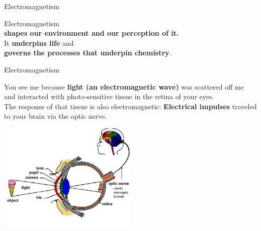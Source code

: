 %
%
%

\begin{frame}{Electromagnetism}

\begin{center}
{\Large
Electromagnetism \\ {\bf shapes our environment and our perception of it.}\\
\vspace{0.3cm}
It {\bf underpins life} and \\ {\bf governs the processes that underpin chemistry}.\\
}
\end{center}
\end{frame}


\begin{frame}{Electromagnetism}

You see me because {\bf light (an electromagnetic wave)} was scattered off me
and interacted with photo-sensitive tissue in the retina of your eyes.\\
The response of that tissue is also electromagnetic:
{\bf Electrical impulses} traveled to your brain via the optic nerve.\\

\begin{center}
   \includegraphics[width=0.50\textwidth]{./images/misc/vision_1.png}\\
\end{center}

\end{frame}

%
%
%


